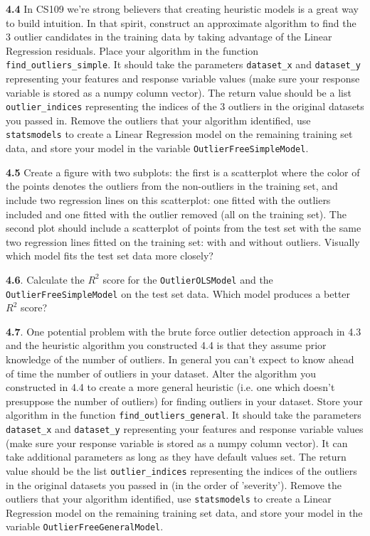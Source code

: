\documentclass[11pt]{article}
\begin{document}
\textbf{4.4} In CS109 we're strong believers that creating heuristic
models is a great way to build intuition. In that spirit, construct an
approximate algorithm to find the 3 outlier candidates in the training
data by taking advantage of the Linear Regression residuals. Place your
algorithm in the function \texttt{find\_outliers\_simple}. It should
take the parameters \texttt{dataset\_x} and \texttt{dataset\_y}
representing your features and response variable values (make sure your
response variable is stored as a numpy column vector). The return value
should be a list \texttt{outlier\_indices} representing the indices of
the 3 outliers in the original datasets you passed in. Remove the
outliers that your algorithm identified, use \texttt{statsmodels} to
create a Linear Regression model on the remaining training set data, and
store your model in the variable \texttt{OutlierFreeSimpleModel}.

\textbf{4.5} Create a figure with two subplots: the first is a
scatterplot where the color of the points denotes the outliers from the
non-outliers in the training set, and include two regression lines on
this scatterplot: one fitted with the outliers included and one fitted
with the outlier removed (all on the training set). The second plot
should include a scatterplot of points from the test set with the same
two regression lines fitted on the training set: with and without
outliers. Visually which model fits the test set data more closely?

\textbf{4.6}. Calculate the \(R^2\) score for the
\texttt{OutlierOLSModel} and the \texttt{OutlierFreeSimpleModel} on the
test set data. Which model produces a better \(R^2\) score?

\textbf{4.7}. One potential problem with the brute force outlier
detection approach in 4.3 and the heuristic algorithm you constructed
4.4 is that they assume prior knowledge of the number of outliers. In
general you can't expect to know ahead of time the number of outliers in
your dataset. Alter the algorithm you constructed in 4.4 to create a
more general heuristic (i.e. one which doesn't presuppose the number of
outliers) for finding outliers in your dataset. Store your algorithm in
the function \texttt{find\_outliers\_general}. It should take the
parameters \texttt{dataset\_x} and \texttt{dataset\_y} representing your
features and response variable values (make sure your response variable
is stored as a numpy column vector). It can take additional parameters
as long as they have default values set. The return value should be the
list \texttt{outlier\_indices} representing the indices of the outliers
in the original datasets you passed in (in the order of 'severity').
Remove the outliers that your algorithm identified, use
\texttt{statsmodels} to create a Linear Regression model on the
remaining training set data, and store your model in the variable
\texttt{OutlierFreeGeneralModel}.
\end{document}
